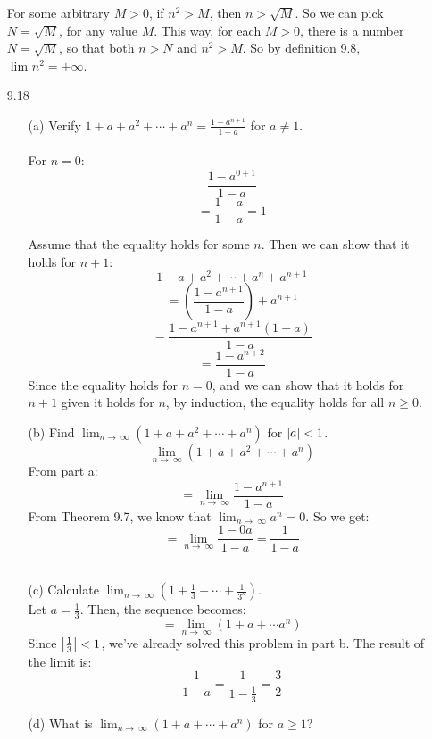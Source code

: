 \begin{itemize}
    For some arbitrary $M > 0$, if $n^2 > M$, then $n > \sqrt{M}$. So we can pick $N = \sqrt{M}$, for any value $M$. This way, for each $M > 0$, there is a number $N = \sqrt{M}$, so that both $n > N$ and $n^2 > M$. So by definition 9.8, $\lim_{} n^2 = +\infty$.\\

  \item [9.18]
    \begin{itemize}
      \item [(a)] Verify $1 + a + a^2 + \cdots + a^n = \frac{1 - a^{n+1}}{1-a}$ for $a \neq 1$.\\\\

        For $n = 0$:
        $$\frac{1 - a^{0+1}}{1-a}$$
        $$=\frac{1 - a}{1-a} = 1$$

        Assume that the equality holds for some $n$. Then we can show that it holds for $n+1$:
        $$1 + a + a^2 + \cdots + a^n + a^{n+1}$$
        $$= (\frac{1 - a^{n+1}}{1-a}) + a^{n+1}$$
        $$= \frac{1 - a^{n+1} + a^{n+1}(1-a)}{1-a}$$
        $$= \frac{1 - a^{n+2}}{1-a}$$
        Since the equality holds for $n=0$, and we can show that it holds for $n+1$ given it holds for $n$, by induction, the equality holds for all $n \geq 0$.\\
        
      \item [(b)] Find $\lim_{n \to\ \infty} (1 + a + a^2 + \cdots + a^n)$ for $\left\vert a \right\vert < 1$.
        $$\lim_{n \to\ \infty} (1 + a + a^2 + \cdots + a^n)$$
        From part a:
        $$=\lim_{n \to\ \infty} \frac{1 - a^{n+1}}{1-a}$$
        From Theorem 9.7, we know that $\lim_{n \to\ \infty} a^n = 0$. So we get:
        $$=\lim_{n \to\ \infty} \frac{1 - 0a}{1-a} = \frac{1}{1-a}$$\\

      \item [(c)] Calculate $\lim_{n \to\ \infty} (1 + \frac{1}{3} + \cdots + \frac{1}{3^n})$.\\

        Let $a = \frac{1}{3}$. Then, the sequence becomes:
        $$=\lim_{n \to\ \infty} (1 + a + \cdots a^n)$$
        Since $\left\vert \frac{1}{3} \right\vert < 1$, we've already solved this problem in part b. The result of the limit is:
        $$\frac{1}{1-a} = \frac{1}{1 - \frac{1}{3}} = \frac{3}{2}$$
      \item [(d)] What is $\lim_{n \to\ \infty} (1 + a + \cdots + a^n)$ for $a \geq 1$?\\\\


\end{itemize}
\end{itemize}
